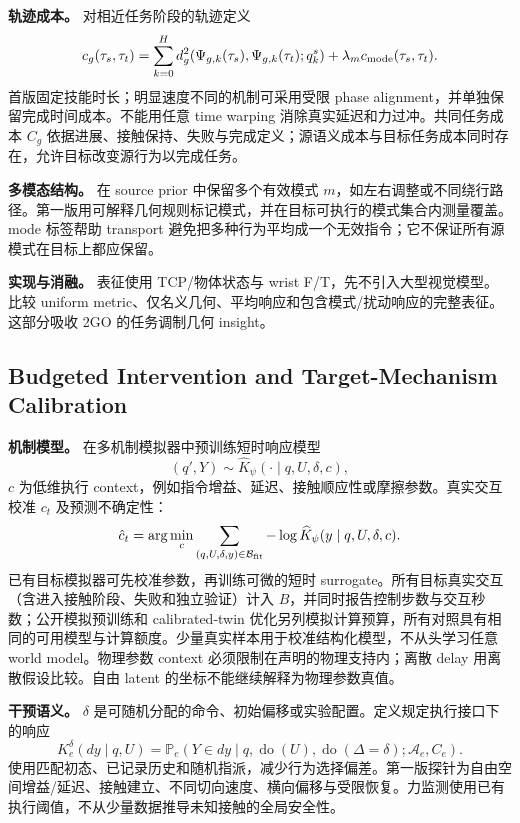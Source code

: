 \documentclass[11pt]{article}
\newcommand{\Prob}{\mathbb P}
\begin{document}
\textbf{轨迹成本。} 对相近任务阶段的轨迹定义
\begin{equation}
 c_g(\tau_s,\tau_t)=
 \sum_{k=0}^{H}d_g^2(\Psi_{g,k}(\tau_s),\Psi_{g,k}(\tau_t);q_k^s)
 +\lambda_m c_{\rm mode}(\tau_s,\tau_t).
 \label{eq:semantic}
\end{equation}
首版固定技能时长；明显速度不同的机制可采用受限 phase alignment，并单独保留完成时间成本。不能用任意 time warping 消除真实延迟和力过冲。共同任务成本 $C_g$ 依据进展、接触保持、失败与完成定义；源语义成本与目标任务成本同时存在，允许目标改变源行为以完成任务。

\textbf{多模态结构。} 在 source prior 中保留多个有效模式 $m$，如左右调整或不同绕行路径。第一版用可解释几何规则标记模式，并在目标可执行的模式集合内测量覆盖。mode 标签帮助 transport 避免把多种行为平均成一个无效指令；它不保证所有源模式在目标上都应保留。

\textbf{实现与消融。} 表征使用 TCP/物体状态与 wrist F/T，先不引入大型视觉模型。比较 uniform metric、仅名义几何、平均响应和包含模式/扰动响应的完整表征。这部分吸收 2GO 的任务调制几何 insight。

\subsection{Budgeted Intervention and Target-Mechanism Calibration}
\label{sec:calibration}
\textbf{机制模型。} 在多机制模拟器中预训练短时响应模型
\begin{equation}
 (q',Y)\sim\widehat K_\psi(\cdot\mid q,U,\delta,c),
 \label{eq:model}
\end{equation}
$c$ 为低维执行 context，例如指令增益、延迟、接触顺应性或摩擦参数。真实交互校准 $c_t$ 及预测不确定性：
\begin{equation}
 \hat c_t=\arg\min_c
 \sum_{(q,U,\delta,y)\in\mathcal B_{\rm fit}}
 -\log\widehat K_\psi(y\mid q,U,\delta,c).
 \label{eq:calibrate}
\end{equation}
已有目标模拟器可先校准参数，再训练可微的短时 surrogate。所有目标真实交互（含进入接触阶段、失败和独立验证）计入 $B$，并同时报告控制步数与交互秒数；公开模拟预训练和 calibrated-twin 优化另列模拟计算预算，所有对照具有相同的可用模型与计算额度。少量真实样本用于校准结构化模型，不从头学习任意 world model。物理参数 context 必须限制在声明的物理支持内；离散 delay 用离散假设比较。自由 latent 的坐标不能继续解释为物理参数真值。

\textbf{干预语义。} $\delta$ 是可随机分配的命令、初始偏移或实验配置。定义规定执行接口下的响应
\begin{equation}
 K_e^\delta(dy\mid q,U)
 =\Prob_e(Y\in dy\mid q,\operatorname{do}(U),
 \operatorname{do}(\Delta=\delta);\mathcal A_e,C_e).
 \label{eq:intervention}
\end{equation}
使用匹配初态、已记录历史和随机指派，减少行为选择偏差。第一版探针为自由空间增益/延迟、接触建立、不同切向速度、横向偏移与受限恢复。力监测使用已有执行阈值，不从少量数据推导未知接触的全局安全性。
\end{document}
